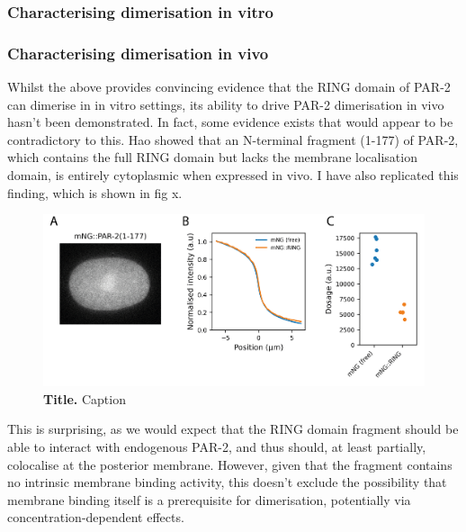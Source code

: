\documentclass[12pt]{"article"}
\newcommand{\mycaption}[2]{\caption[#1]{\textbf{#1.} #2}}
\begin{document}
\subsubsection{Characterising dimerisation in vitro}

\clearpage
\subsubsection{Characterising dimerisation in vivo}


Whilst the above provides convincing evidence that the RING domain of PAR-2 can dimerise in in vitro settings, its ability to drive PAR-2 dimerisation in vivo hasn't been demonstrated. In fact, some evidence exists that would appear to be contradictory to this. Hao showed that an N-terminal fragment (1-177) of PAR-2, which contains the full RING domain but lacks the membrane localisation domain, is entirely cytoplasmic when expressed in vivo. I have also replicated this finding, which is shown in fig x.\\

\begin{figure}[!h]
\includegraphics[scale=0.9]{ring_fragment_in_vivo}
\setlength{\abovecaptionskip}{20pt}
\centering
\mycaption{Title}{Caption}
\end{figure}

This is surprising, as we would expect that the RING domain fragment should be able to interact with endogenous PAR-2, and thus should, at least partially, colocalise at the posterior membrane. However, given that the fragment contains no intrinsic membrane binding activity, this doesn't exclude the possibility that membrane binding itself is a prerequisite for dimerisation, potentially via concentration-dependent effects.\\
\end{document}
